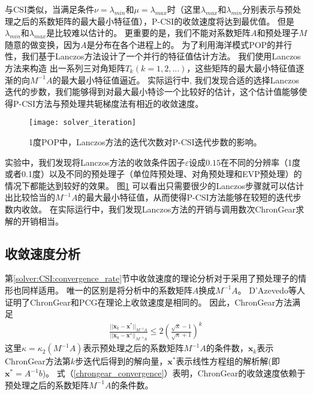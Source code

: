 与CSI类似，当满足条件$\nu = \lambda_{min}$和$\mu =\lambda_{max}$时（这里$\lambda_{max}$和$\lambda_{min}$分别表示与预处理之后的系数矩阵的最大最小特征值），P-CSI的收敛速度将达到最优值。 
但是$\lambda_{min}$和$\lambda_{max}$是比较难以估计的。
更重要的是，我们不能对系数矩阵$A$和预处理子$M$随意的做变换，因为$A$是分布在各个进程上的。
为了利用海洋模式POP的并行性，我们基于Lanczos方法设计了一个并行的特征值估计方法。
我们使用Lanczos方法来构造 出一系列三对角矩阵$T_k(k=1,2,...)$，这些矩阵的最大最小特征值逐渐的向$M^{-1}A$的最大最小特征值逼近。
实际运行中, 我们发现合适的选择Lanczos迭代的步数，我们能够得到对最大最小特诊一个比较好的估计，这个估计值能够使得P-CSI方法与预处理共轭梯度法有相近的收敛速度。  
  

\begin {figure}[!t]
\begin{center}
\texttt{[image: solver\_iteration]}
\caption []{1度POP中，Lanczos方法的迭代次数对P-CSI迭代步数的影响。 \label{fig:iter}}
\end{center}
\end {figure}
实验中，我们发现将Lanczos方法的收敛条件因子$\varepsilon$设成$0.15$在不同的分辨率（1度或者0.1度）以及不同的预处理子（单位阵预处理、对角预处理和EVP预处理）的情况下都能达到较好的效果。 
图\ref{fig:iter} 可以看出只需要很少的Lanczos步骤就可以估计出比较恰当的$M^{-1}A$的最大最小特征值，从而使得P-CSI方法能够在较短的迭代步数内收敛。
在实际运行中，我们发现Lanczos方法的开销与调用数次ChronGear求解的开销相当。 

\subsection{收敛速度分析}
\label{precond:converge}

第\ref{solver:CSI:convergence_rate}节中收敛速度的理论分析对于采用了预处理子的情形也同样适用。
唯一的区别是将分析中的系数矩阵$A$换成$M^{-1}A$。
D'Azevedo\cite{dAzevedo1999lapack}等人证明了ChronGear和PCG在理论上收敛速度是相同的。
因此，ChronGear方法满足 
\begin{align}
\label{chrongear_convergence}
\frac{||\textbf{x}_k-\textbf{x}^*||_{M^{-1}A}}{||\textbf{x}_0-\textbf{x}^*||_{M^{-1}A}}\le  2 (\frac{\sqrt{\kappa}-1}{\sqrt{\kappa}+1})^k 
\end{align}
这里$\kappa =  \kappa_2({M^{-1}A})$表示预处理之后的系数矩阵${M^{-1}A}$的条件数，$\textbf{x}_k$表示ChronGear方法第$k$步迭代后得到的解向量，$\textbf{x}^*$表示线性方程组的解析解(即$\textbf{x}^* = A^{-1}b$)。
式（\ref{chrongear_convergence}）表明，ChronGear的收敛速度依赖于预处理之后的系数矩阵${M^{-1}A}$的条件数。 


